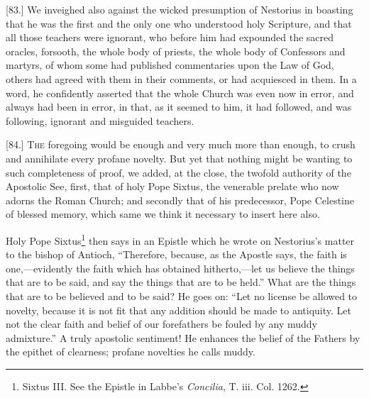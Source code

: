 [83.] We inveighed also against the wicked presumption of Nestorius in boasting that he was the first and the only one who understood holy Scripture, and that all those teachers were ignorant, who before him had expounded the sacred oracles, forsooth, the whole body of priests, the whole body of Confessors and martyrs, of whom some had published commentaries upon the Law of God, others had agreed with them in their comments, or had acquiesced in them. In a word, he confidently asserted that the whole Church was even now in error, and always had been in error, in that, as it seemed to him, it had followed, and was following, ignorant and misguided teachers.


[84.] \textsc{The} foregoing would be enough and very much more than enough, to crush and annihilate every profane novelty. But yet that nothing might be wanting to such completeness of proof, we added, at the close, the twofold authority of the Apostolic See, first, that of holy Pope Sixtus, the venerable prelate who now adorns the Roman Church; and secondly that of his predecessor, Pope Celestine of blessed memory, which same we think it necessary to insert here also.

Holy Pope Sixtus\footnote{Sixtus III. See the Epistle in Labbe’s \emph{Concilia}, T. iii. Col. 1262.} then says in an Epistle which he wrote on Nestorius’s matter to the bishop of Antioch, “Therefore, because, as the Apostle says, the faith is one,—evidently the faith which has obtained hitherto,—let us believe the things that are to be said, and say the things that are to be held.” What are the things that are to be believed and to be said? He goes on: “Let no license be allowed to novelty, because it is not fit that any addition should be made to antiquity. Let not the clear faith and belief of our forefathers be fouled by any muddy admixture.” A truly apostolic sentiment! He enhances the belief of the Fathers by the epithet of clearness; profane novelties he calls muddy.

